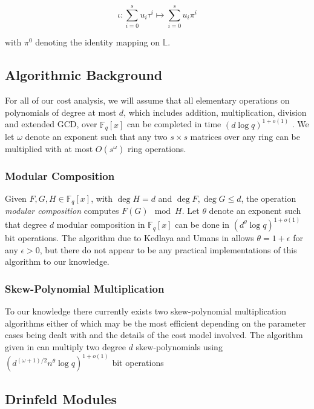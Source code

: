 \documentclass[sigconf]{acmart}
\newcommand{\F}{\mathbb{F}}
\renewcommand{\L}{\mathbb{L}}
\begin{document}
\begin{equation*}
    \iota : \sum_{i=0}^su_i\tau^i \mapsto \sum_{i=0}^su_i\pi^i 
\end{equation*}

with $\pi^0$ denoting the identity mapping on $\L$.

\subsection{Algorithmic Background}

For all of our cost analysis, we will assume that all elementary operations on polynomials of degree at most $d$, which includes addition, multiplication, division and extended GCD, over $\F_q[x]$ can be completed in time $(d \log q)^{1 + o(1)}$ \cite{vonzurgathen_gerhard_2013}. We let $\omega$ denote an exponent such that any two $s\times s$ matrices over any ring can be multiplied with at most $O(s^{\omega})$ ring operations. 

\subsubsection{Modular Composition} 
Given $F,G,H \in \F_q[x]$, with $\deg H = d$ and $\deg F, \deg G \leq d$, the operation \textit{modular composition} computes $F(G) \mod H$. Let $\theta$ denote an exponent such that degree $d$ modular composition in $\F_q[x]$ can be done in $(d^{\theta} \log q)^{1 + o(1)}$ bit operations. The algorithm due to Kedlaya and Umans in \cite{kedlaya_umans} allows $\theta = 1 + \epsilon$ for any $\epsilon > 0$, but there do not appear to be any practical implementations of this algorithm to our knowledge.

\subsubsection{Skew-Polynomial Multiplication} 

To our knowledge there currently exists two skew-polynomial multiplication algorithms either of which may be the most efficient depending on the parameter cases being dealt with and the details of the cost model involved. The algorithm given in \cite{PuchingerW15} can multiply two degree $d$ skew-polynomials using $(d^{(\omega + 1)/2}n^{\theta} \log q)^{1 + o(1)}$ bit operations

\subsection{Drinfeld Modules}
\end{document}
